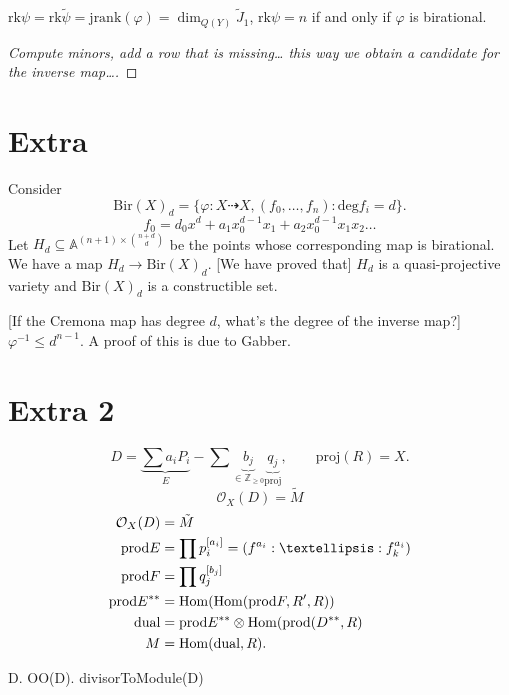 \begin{proposition}
\label{proposition-rank-and-birationality}
$\text{rk}\psi=\text{rk}\tilde{\psi}=
\text{jrank}(\varphi)
=\dim_{Q(Y)}\tilde{J}_1$,
$\text{rk}\psi=n$ if and only if
$\varphi$ is birational.
\end{proposition}

\begin{proof}
[Compute minors, add a row that is missing…
this way we obtain a candidate for the
inverse map…]
\end{proof}

\section{Extra}
\label{section-extra}

\noindent
Consider
$$
\text{Bir}(X)_d
= \{ \varphi:X \dashrightarrow
X,(f_0,…,f_n):\text{deg} f_i=d\}.
$$
$$
f_0=d_0x^d+a_1x_0^{d-1}x_1
+a_2x_0^{d-1}x_1x_2…
$$
Let $H_d \subseteq
\mathbb{A}^{(n+1)\times\binom{n+d}{d}}$
be the points whose corresponding map is
birational.
We have a map $H_d \to \text{Bir}(X)_d$.
[We have proved that] $H_d$ is a
quasi-projective variety
and $\text{Bir}(X)_d$ is a constructible set.

[If the Cremona map has degree $d$,
what's the degree of the inverse map?]
$\varphi^{-1}\leq d^{n-1}$.
A proof of this is due to Gabber.

\section{Extra 2}
\label{section-extra2}

$$
D=\underbrace{\sum a_i P_i}_{E}
- \sum\underbrace{b_j}_{\in \mathbb{Z}_{\geq
0}}
\underbrace{q_j}_{\text{proj}},
\qquad \text{proj}(R)=X.
$$
$$
\mathcal{O}_X(D)=\tilde{M}
$$
$$
\begin{aligned}
\mathcal{O}_X(D)&=\tilde{M}\\
\text{prod}E&=\prod p_i^{[a_i]}=(f^{a_i}:…:
f_k^{a_i})\\
\text{prod}F&=\prod q_j^{[b_j]}\\
\text{prod}E^{\ast \ast}&=
\Hom(\Hom(\text{prod}F,R',R))\\
\text{dual}&=\text{prod}E^{\ast \ast}\otimes
\Hom(\text{prod}(D^{\ast \ast},R)\\
M&=\Hom(\text{dual},R).
\end{aligned}
$$

\noindent
D. OO(D). divisorToModule(D)

